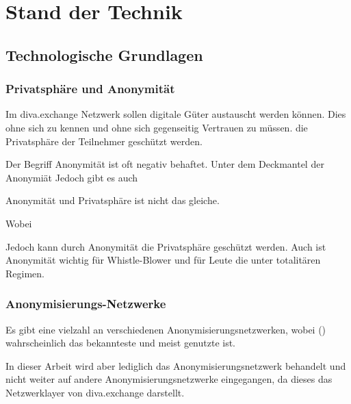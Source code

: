 \chapter{Stand der Technik}\label{ch:StandDerTechnik}




\section{Technologische Grundlagen}

\subsection{Privatsphäre und Anonymität}

Im diva.exchange Netzwerk sollen digitale Güter austauscht werden können.
Dies ohne sich zu kennen und ohne sich gegenseitig Vertrauen zu müssen.
die Privatsphäre der Teilnehmer geschützt werden.


Der Begriff Anonymität ist oft negativ behaftet.
Unter dem Deckmantel der Anonymiät
Jedoch gibt es auch 

Anonymität und Privatsphäre ist nicht das gleiche.

Wobei

Jedoch kann durch Anonymität die Privatsphäre geschützt werden.
Auch ist Anonymität wichtig für Whistle-Blower und für Leute die unter totalitären Regimen.

\subsection{Anonymisierungs-Netzwerke}

Es gibt eine vielzahl an verschiedenen Anonymisierungsnetzwerken, wobei  () wahrscheinlich das bekannteste und meist genutzte ist.

In dieser Arbeit wird aber lediglich das Anonymisierungsnetzwerk  behandelt und nicht weiter auf andere Anonymisierungsnetzwerke eingegangen, da dieses das Netzwerklayer von diva.exchange darstellt.


